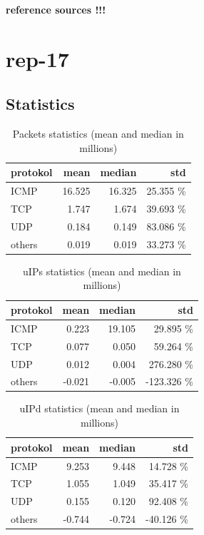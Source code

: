 \textbf{reference sources !!!}

\section*{rep-17}
\subsection*{Statistics}
\begin{table}[H]
\center
\begin{tabular}{lrrr}
\toprule
protokol & mean & median & std \\
\midrule
ICMP &   16.525  &  16.325  &  25.355 \% \\
TCP &     1.747  &   1.674  &  39.693 \% \\
UDP &     0.184  &   0.149  &  83.086 \% \\
others &  0.019  &   0.019  &  33.273 \% \\
\end{tabular}
\caption{Packets statistics (mean and median in millions)}
\label{tab:proto-stats-packets}
\end{table}

\begin{table}[H]
\center
\begin{tabular}{lrrr}
\toprule
protokol & mean & median & std \\
\midrule
ICMP &    0.223 & 19.105 &   29.895 \% \\
TCP &     0.077 &  0.050 &   59.264 \% \\
UDP &     0.012 &  0.004 &  276.280 \% \\
others & -0.021 & -0.005 & -123.326 \% \\
\end{tabular}
\caption{uIPs statistics (mean and median in millions)}
\label{tab:proto-stats-packets}
\end{table}

\begin{table}[H]
\center
\begin{tabular}{lrrr}
\toprule
protokol & mean & median & std \\
\midrule
ICMP &    9.253 &  9.448 &  14.728 \%  \\
TCP &     1.055 &  1.049 &  35.417 \%  \\
UDP &     0.155 &  0.120 &  92.408 \%  \\
others & -0.744 & -0.724 & -40.126 \%  \\
\end{tabular}
\caption{uIPd statistics (mean and median in millions)}
\label{tab:proto-stats-packets}
\end{table}
